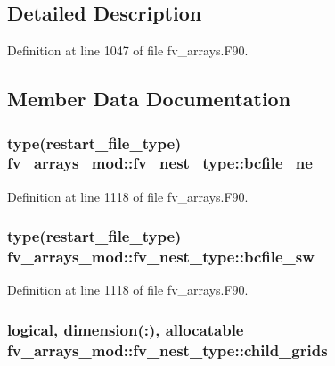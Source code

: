 \subsection{Detailed Description}


Definition at line 1047 of file fv\-\_\-arrays.\-F90.



\subsection{Member Data Documentation}
\subsubsection[{bcfile\-\_\-ne}]{\setlength{\rightskip}{0pt plus 5cm}type(restart\-\_\-file\-\_\-type) fv\-\_\-arrays\-\_\-mod\-::fv\-\_\-nest\-\_\-type\-::bcfile\-\_\-ne}\label{structfv__arrays__mod_1_1fv__nest__type_a6c3a42fa4470f85cb7122203f20c91b1}


Definition at line 1118 of file fv\-\_\-arrays.\-F90.

\subsubsection[{bcfile\-\_\-sw}]{\setlength{\rightskip}{0pt plus 5cm}type(restart\-\_\-file\-\_\-type) fv\-\_\-arrays\-\_\-mod\-::fv\-\_\-nest\-\_\-type\-::bcfile\-\_\-sw}\label{structfv__arrays__mod_1_1fv__nest__type_ae213d6b31c417bf50951cbfdd69f1713}


Definition at line 1118 of file fv\-\_\-arrays.\-F90.

\subsubsection[{child\-\_\-grids}]{\setlength{\rightskip}{0pt plus 5cm}logical, dimension(\-:), allocatable fv\-\_\-arrays\-\_\-mod\-::fv\-\_\-nest\-\_\-type\-::child\-\_\-grids}\label{structfv__arrays__mod_1_1fv__nest__type_a81f66a31dbcd4e6d25c2c40fe713d270}


